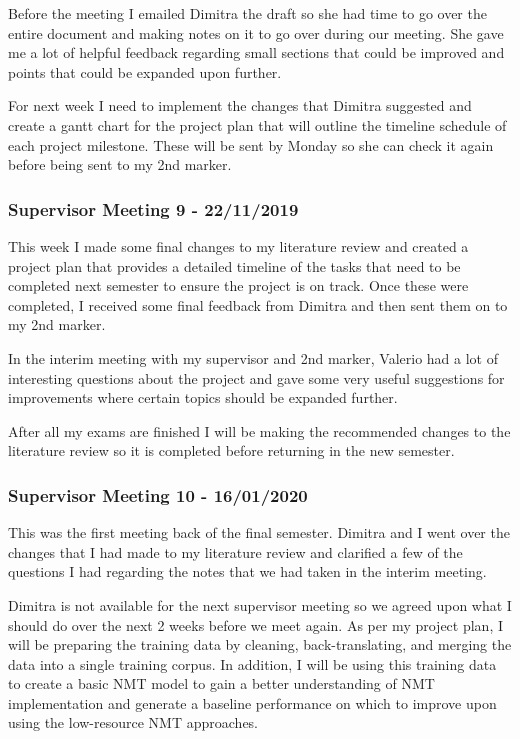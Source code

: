 Before the meeting I emailed Dimitra the draft so she had time to go over the entire document and making notes on it to go over during our meeting. She gave me a lot of helpful feedback regarding small sections that could be improved and points that could be expanded upon further.

For next week I need to implement the changes that Dimitra suggested and create a gantt chart for the project plan that will outline the timeline schedule of each project milestone. These will be sent by Monday so she can check it again before being sent to my 2nd marker.

\subsubsection{Supervisor Meeting 9 - 22/11/2019}
This week I made some final changes to my literature review and created a project plan that provides a detailed timeline of the tasks that need to be completed next semester to ensure the project is on track. Once these were completed, I received some final feedback from Dimitra and then sent them on to my 2nd marker.

In the interim meeting with my supervisor and 2nd marker, Valerio had a lot of interesting questions about the project and gave some very useful suggestions for improvements where certain topics should be expanded further.

After all my exams are finished I will be making the recommended changes to the literature review so it is completed before returning in the new semester.

\subsubsection{Supervisor Meeting 10 - 16/01/2020}
This was the first meeting back of the final semester. Dimitra and I went over the changes that I had made to my literature review and clarified a few of the questions I had regarding the notes that we had taken in the interim meeting.

Dimitra is not available for the next supervisor meeting so we agreed upon what I should do over the next 2 weeks before we meet again. As per my project plan, I will be preparing the training data by cleaning, back-translating, and merging the data into a single training corpus. In addition, I will be using this training data to create a basic \acrshort{NMT} model to gain a better understanding of \acrshort{NMT} implementation and generate a baseline performance on which to improve upon using the low-resource \acrshort{NMT} approaches.


